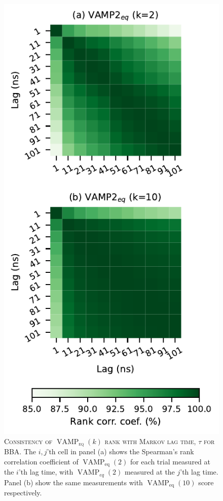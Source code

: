 \documentclass[journal=jacsat,manuscript=article]{achemso}
\begin{document}
\begin{figure}[ht]
    \centering
    \includegraphics{results4/vampeq_rank_vs_lag.pdf}
    \caption{\textsc{Consistency of $\operatorname{VAMP}_{\mathrm{eq}}(k)$ rank with Markov lag time, $\tau$ for BBA}. The $i, j$'th cell in panel (a) shows the Spearman's rank correlation coefficient of $\operatorname{VAMP}_{\mathrm{eq}}(2)$ for each trial measured at the $i$'th lag time, with  $\operatorname{VAMP}_{eq}(2)$  measured at the $j$'th lag time.   Panel (b) show the same measurements with $\operatorname{VAMP}_{\mathrm{eq}}(10)$ score respectively. }
    \label{fig:vamp_rank_vs_lag}
\end{figure}
\end{document}
